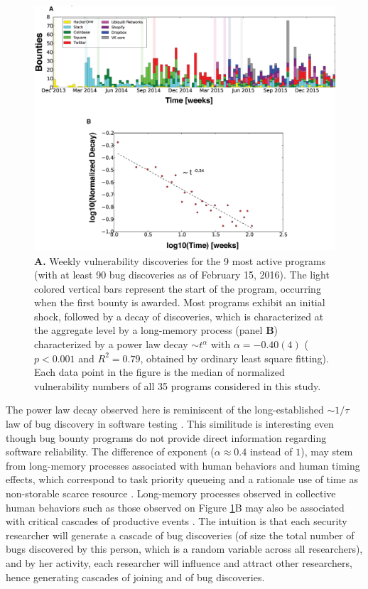 \begin{figure}[h]
\begin{center}
\includegraphics[width=12cm]{../figures/timeline.eps}
\caption{\footnotesize {\bf A.} Weekly vulnerability discoveries for the 9 most active programs (with at least 90 bug discoveries as of February 15, 2016). The light colored vertical bars represent the start of the program, occurring when the first bounty is awarded. Most programs exhibit an initial shock, followed by a decay of discoveries, which is characterized at the aggregate level by a long-memory process (panel {\bf B}) characterized by a power law decay $\sim t^{\alpha}$ with $\alpha = -0.40(4)$ ($p < 0.001$ and $R^2 = 0.79$, obtained by ordinary least square fitting). Each data point in the figure is the median of normalized vulnerability numbers of all 35 programs considered in this study.}
\label{timeline}
\end{center}
\end{figure}

The power law decay observed here is reminiscent of the long-established $\sim 1/\tau$ law of bug discovery in software testing \cite{adams1984textordfeminineoptimizing}. This similitude is interesting even though bug bounty programs do not provide direct information regarding software reliability. The difference of exponent ($\alpha \approx 0.4$ instead of $1$), may stem from long-memory processes associated with human behaviors and human timing effects, which correspond to task priority queueing and a rationale use of time as non-storable scarce resource \cite{maillart2011quantification}. Long-memory processes observed in collective human behaviors such as those observed on Figure \ref{timeline}B may also be associated with critical cascades of productive events \cite{sornette2014much}. The intuition is that each security researcher will generate a cascade of bug discoveries (of size the total number of bugs discovered by this person, which is a random variable across all researchers), and by her activity, each researcher will influence and attract other researchers, hence generating cascades of joining and of bug discoveries.

